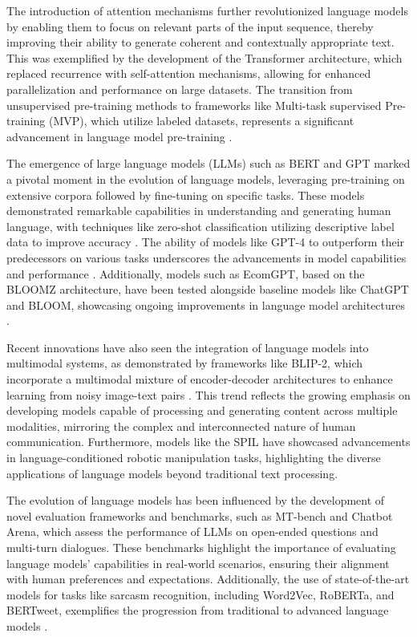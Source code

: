 The introduction of attention mechanisms further revolutionized language models by enabling them to focus on relevant parts of the input sequence, thereby improving their ability to generate coherent and contextually appropriate text. This was exemplified by the development of the Transformer architecture, which replaced recurrence with self-attention mechanisms, allowing for enhanced parallelization and performance on large datasets. The transition from unsupervised pre-training methods to frameworks like Multi-task supervised Pre-training (MVP), which utilize labeled datasets, represents a significant advancement in language model pre-training \cite{tang2023mvpmultitasksupervisedpretraining}.

The emergence of large language models (LLMs) such as BERT and GPT marked a pivotal moment in the evolution of language models, leveraging pre-training on extensive corpora followed by fine-tuning on specific tasks. These models demonstrated remarkable capabilities in understanding and generating human language, with techniques like zero-shot classification utilizing descriptive label data to improve accuracy \cite{gao2023benefitslabeldescriptiontrainingzeroshot}. The ability of models like GPT-4 to outperform their predecessors on various tasks underscores the advancements in model capabilities and performance \cite{haghighi2017eegassistedmodulationsoundsources}. Additionally, models such as EcomGPT, based on the BLOOMZ architecture, have been tested alongside baseline models like ChatGPT and BLOOM, showcasing ongoing improvements in language model architectures \cite{li2023blip}.

Recent innovations have also seen the integration of language models into multimodal systems, as demonstrated by frameworks like BLIP-2, which incorporate a multimodal mixture of encoder-decoder architectures to enhance learning from noisy image-text pairs \cite{li2023blip}. This trend reflects the growing emphasis on developing models capable of processing and generating content across multiple modalities, mirroring the complex and interconnected nature of human communication. Furthermore, models like the SPIL have showcased advancements in language-conditioned robotic manipulation tasks, highlighting the diverse applications of language models beyond traditional text processing.

The evolution of language models has been influenced by the development of novel evaluation frameworks and benchmarks, such as MT-bench and Chatbot Arena, which assess the performance of LLMs on open-ended questions and multi-turn dialogues. These benchmarks highlight the importance of evaluating language models' capabilities in real-world scenarios, ensuring their alignment with human preferences and expectations. Additionally, the use of state-of-the-art models for tasks like sarcasm recognition, including Word2Vec, RoBERTa, and BERTweet, exemplifies the progression from traditional to advanced language models \cite{nimase2024morecontextshelpsarcasm}.

